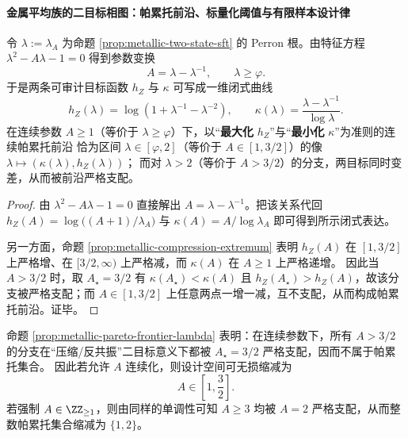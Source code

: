 \paragraph{金属平均族的二目标相图：帕累托前沿、标量化阈值与有限样本设计律}

\begin{proposition}\label{prop:metallic-pareto-frontier-lambda}
令 \(\lambda:=\lambda_A\) 为命题 \ref{prop:metallic-two-state-sft} 的 Perron 根。由特征方程
\(\lambda^2-A\lambda-1=0\) 得到参数变换
\[
A=\lambda-\lambda^{-1},\qquad \lambda\ge \varphi.
\]
于是两条可审计目标函数 \(h_Z\) 与 \(\kappa\) 可写成一维闭式曲线
\[
h_Z(\lambda)=\log\!\left(1+\lambda^{-1}-\lambda^{-2}\right),
\qquad
\kappa(\lambda)=\frac{\lambda-\lambda^{-1}}{\log\lambda}.
\]
在连续参数 \(A\ge 1\)（等价于 \(\lambda\ge\varphi\)）下，以“\textbf{最大化} \(h_Z\)”与“\textbf{最小化} \(\kappa\)”为准则的连续帕累托前沿
恰为区间 \(\lambda\in[\varphi,2]\)（等价于 \(A\in[1,3/2]\)）的像 \(\lambda\mapsto(\kappa(\lambda),h_Z(\lambda))\)；
而对 \(\lambda>2\)（等价于 \(A>3/2\)）的分支，两目标同时变差，从而被前沿严格支配。
\end{proposition}
\begin{proof}
由 \(\lambda^2-A\lambda-1=0\) 直接解出 \(A=\lambda-\lambda^{-1}\)。把该关系代回
\(
h_Z(A)=\log\bigl((A+1)/\lambda_A\bigr)
\)
与
\(
\kappa(A)=A/\log\lambda_A
\)
即可得到所示闭式表达。
\par
另一方面，命题 \ref{prop:metallic-compression-extremum} 表明 \(h_Z(A)\) 在 \([1,3/2]\) 上严格增、在 \([3/2,\infty)\) 上严格减，而 \(\kappa(A)\) 在 \(A\ge 1\) 上严格递增。
因此当 \(A>3/2\) 时，取 \(A_\star=3/2\) 有 \(\kappa(A_\star)<\kappa(A)\) 且 \(h_Z(A_\star)>h_Z(A)\)，故该分支被严格支配；而 \(A\in[1,3/2]\) 上任意两点一增一减，互不支配，从而构成帕累托前沿。证毕。
\end{proof}

\begin{remark}\label{rem:metallic-design-space-reduction}
命题 \ref{prop:metallic-pareto-frontier-lambda} 表明：在连续参数下，所有 \(A>3/2\) 的分支在“压缩/反共振”二目标意义下都被 \(A_\star=3/2\) 严格支配，因而不属于帕累托集合。
因此若允许 \(A\) 连续化，则设计空间可无损缩减为
\[
A\in\left[1,\frac{3}{2}\right].
\]
若强制 \(A\in\ZZ_{\ge 1}\)，则由同样的单调性可知 \(A\ge 3\) 均被 \(A=2\) 严格支配，从而整数帕累托集合缩减为 \(\{1,2\}\)。
\end{remark}

